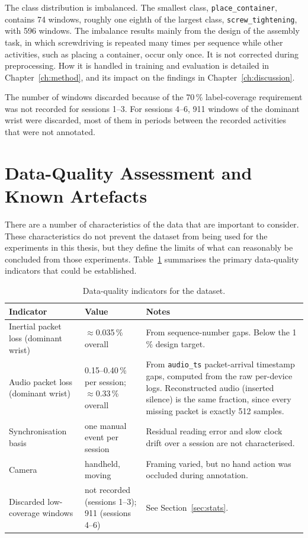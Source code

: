 The class distribution is imbalanced. The smallest class,
\texttt{place\_container}, contains 74 windows, roughly one eighth of the largest
class, \texttt{screw\_tightening}, with 596 windows. The imbalance results mainly
from the design of the assembly task, in which screwdriving is repeated many times
per sequence while other activities, such as placing a container, occur only
once. It is not corrected during preprocessing. How it is handled in training and
evaluation is detailed in Chapter~\ref{ch:method}, and its impact on the findings
in Chapter~\ref{ch:discussion}.

The number of windows discarded because of the 70\,\% label-coverage requirement
was not recorded for sessions 1--3. For sessions 4--6, 911 windows of the
dominant wrist were discarded, most of them in periods between the recorded
activities that were not annotated.

\section{Data-Quality Assessment and Known Artefacts}
\label{sec:quality}

There are a number of characteristics of the data that are important to
consider. These characteristics do not prevent the dataset from being used for
the experiments in this thesis, but they define the limits of what can
reasonably be concluded from those experiments. Table~\ref{tab:quality}
summarises the primary data-quality indicators that could be established.

\begin{table}[htbp]
\centering
\footnotesize
\setlength{\tabcolsep}{3.5pt}
\renewcommand{\arraystretch}{1.2}
\begin{tabularx}{\textwidth}{|p{3.5cm}|p{2.3cm}|X|}
\hline
\textbf{Indicator} & \textbf{Value} & \textbf{Notes} \\
\hline
Inertial packet loss (dominant wrist) & $\approx$0.035\,\% overall &
  From sequence-number gaps. Below the 1\,\% design target. \\
Audio packet loss (dominant wrist) & 0.15--0.40\,\% per session; $\approx$0.33\,\% overall &
  From \texttt{audio\_ts} packet-arrival timestamp gaps, computed from the raw
  per-device logs. Reconstructed audio (inserted silence) is the same
  fraction, since every missing packet is exactly 512 samples. \\
Synchronisation basis & one manual event per session &
  Residual reading error and slow clock drift over a session are not
  characterised. \\
Camera & handheld, moving &
  Framing varied, but no hand action was occluded during annotation. \\
Discarded low-coverage windows & not recorded (sessions 1--3); 911 (sessions 4--6) & See Section~\ref{sec:stats}. \\
\hline
\end{tabularx}
\caption{Data-quality indicators for the dataset.}
\label{tab:quality}
\end{table}

